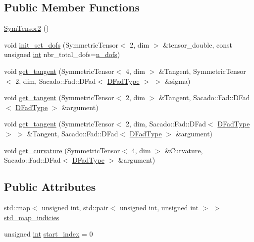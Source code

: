\subsection*{Public Member Functions}
\begin{DoxyCompactItemize}
\item 
\hyperlink{classSacado__Wrapper_1_1SymTensor2_ae43e523ee18d7bf678e5d426df92cd49}{Sym\+Tensor2} ()
\item 
void \hyperlink{classSacado__Wrapper_1_1SymTensor2_a54495897cfdd887d0081015571a28107}{init\+\_\+set\+\_\+dofs} (Symmetric\+Tensor$<$ 2, dim $>$ \&tensor\+\_\+double, const unsigned \hyperlink{CMakeCache_8txt_a79a3d8790b2588b09777910863574e09}{int} nbr\+\_\+total\+\_\+dofs=\hyperlink{classSacado__Wrapper_1_1SymTensor2_ad9d6542de5481e0d41bd1831cb0aeaff}{n\+\_\+dofs})
\item 
void \hyperlink{classSacado__Wrapper_1_1SymTensor2_a4a7d1a0e9efb9d4a6bf6768a75611762}{get\+\_\+tangent} (Symmetric\+Tensor$<$ 4, dim $>$ \&Tangent, Symmetric\+Tensor$<$ 2, dim, Sacado\+::\+Fad\+::\+D\+Fad$<$ \hyperlink{Sacado__Wrapper_8h_a7e0893207b87dad05c66a34baac8ed2e}{D\+Fad\+Type} $>$ $>$ \&sigma)
\item 
void \hyperlink{classSacado__Wrapper_1_1SymTensor2_aad13518e282739f93126adb9db351474}{get\+\_\+tangent} (Symmetric\+Tensor$<$ 2, dim $>$ \&Tangent, Sacado\+::\+Fad\+::\+D\+Fad$<$ \hyperlink{Sacado__Wrapper_8h_a7e0893207b87dad05c66a34baac8ed2e}{D\+Fad\+Type} $>$ \&argument)
\item 
void \hyperlink{classSacado__Wrapper_1_1SymTensor2_a7cd555be3d8c00559af7954671f417fa}{get\+\_\+tangent} (Symmetric\+Tensor$<$ 2, dim, Sacado\+::\+Fad\+::\+D\+Fad$<$ \hyperlink{Sacado__Wrapper_8h_a7e0893207b87dad05c66a34baac8ed2e}{D\+Fad\+Type} $>$ $>$ \&Tangent, Sacado\+::\+Fad\+::\+D\+Fad$<$ \hyperlink{Sacado__Wrapper_8h_a7e0893207b87dad05c66a34baac8ed2e}{D\+Fad\+Type} $>$ \&argument)
\item 
void \hyperlink{classSacado__Wrapper_1_1SymTensor2_aeff4168705676c8f8c050e9ea1fc46be}{get\+\_\+curvature} (Symmetric\+Tensor$<$ 4, dim $>$ \&Curvature, Sacado\+::\+Fad\+::\+D\+Fad$<$ \hyperlink{Sacado__Wrapper_8h_a7e0893207b87dad05c66a34baac8ed2e}{D\+Fad\+Type} $>$ \&argument)
\end{DoxyCompactItemize}
\subsection*{Public Attributes}
\begin{DoxyCompactItemize}
\item 
std\+::map$<$ unsigned \hyperlink{CMakeCache_8txt_a79a3d8790b2588b09777910863574e09}{int}, std\+::pair$<$ unsigned \hyperlink{CMakeCache_8txt_a79a3d8790b2588b09777910863574e09}{int}, unsigned \hyperlink{CMakeCache_8txt_a79a3d8790b2588b09777910863574e09}{int} $>$ $>$ \hyperlink{classSacado__Wrapper_1_1SymTensor2_a1c6b89438714315ae209f4687b687505}{std\+\_\+map\+\_\+indicies}
\item 
unsigned \hyperlink{CMakeCache_8txt_a79a3d8790b2588b09777910863574e09}{int} \hyperlink{classSacado__Wrapper_1_1SymTensor2_ab14d036243a7505e918af354b1cb74d9}{start\+\_\+index} = 0
\end{DoxyCompactItemize}
